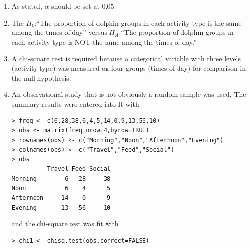 \documentclass[10pt,openany]{book}\usepackage[]{graphicx}\usepackage[]{color}
\makeatletter
\newenvironment{kframe}{%
 \def\at@end@of@kframe{}%
 \ifinner\ifhmode%
  \def\at@end@of@kframe{\end{minipage}}%
  \begin{minipage}{\columnwidth}%
 \fi\fi%
 \def\FrameCommand##1{\hskip\@totalleftmargin \hskip-\fboxsep
 \colorbox{shadecolor}{##1}\hskip-\fboxsep
     \hskip-\linewidth \hskip-\@totalleftmargin \hskip\columnwidth}%
 \MakeFramed {\advance\hsize-\width
   \@totalleftmargin\z@ \linewidth\hsize
   \@setminipage}}%
 {\par\unskip\endMakeFramed%
 \at@end@of@kframe}
\newenvironment{knitrout}{}{} %
\makeatother
\begin{document}
\begin{itemize}
\begin{enumerate}
      \item As stated, $\alpha$ should be set at 0.05.
      \item The $H_{0}$:``The proportion of dolphin groups in each activity type is the same among the times of day'' versus $H_{A}$:``The proportion of dolphin groups in each activity type is NOT the same among the times of day.''
      \item A chi-square test is required because a categorical variable with three levels (activity type) was measured on four groups (times of day) for comparison in the null hypothesis.
      \item An observational study that is not obviously a random sample was used.  The summary results were entered into R with
\begin{knitrout}
\color{fgcolor}\begin{kframe}
\begin{verbatim}
> freq <- c(6,28,38,6,4,5,14,0,9,13,56,10)
> obs <- matrix(freq,nrow=4,byrow=TRUE)
> rownames(obs) <- c("Morning","Noon","Afternoon","Evening")
> colnames(obs) <- c("Travel","Feed","Social")
> obs
          Travel Feed Social
Morning        6   28     38
Noon           6    4      5
Afternoon     14    0      9
Evening       13   56     10
\end{verbatim}
\end{kframe}
\end{knitrout}
and the chi-square test was fit with
\begin{knitrout}
\color{fgcolor}\begin{kframe}
\begin{verbatim}
> chi1 <- chisq.test(obs,correct=FALSE)
\end{verbatim}



\end{kframe}
\end{knitrout}
\end{enumerate}
\end{itemize}
\end{document}
